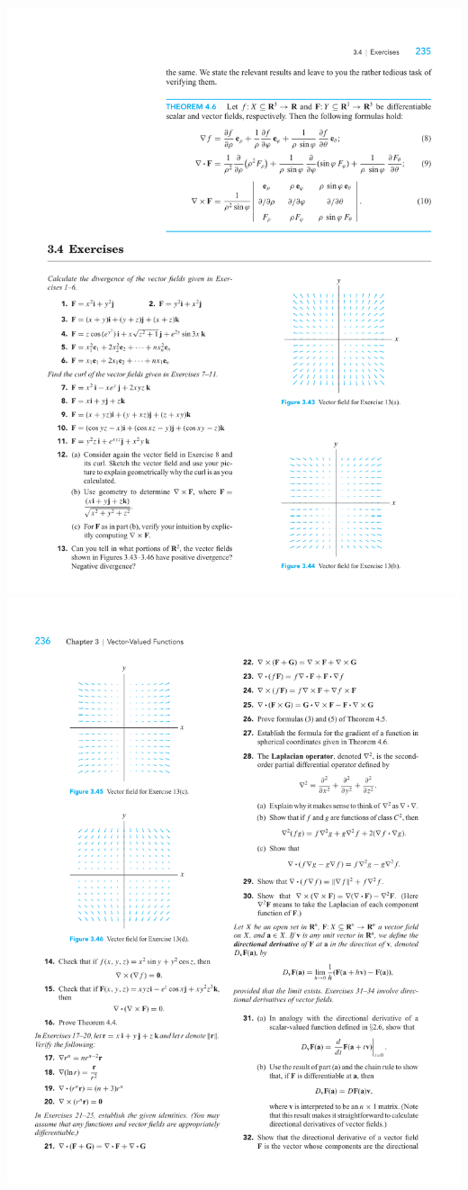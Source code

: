 \documentclass[boxes]{gsypset}
\begin{document}
\begin{problem}[3.4.13]
\begin{center}
		\includegraphics{img/3_4_13b}\\
		\includegraphics{img/3_4_13c}\qquad

\end{center}
\end{problem}
\end{document}
